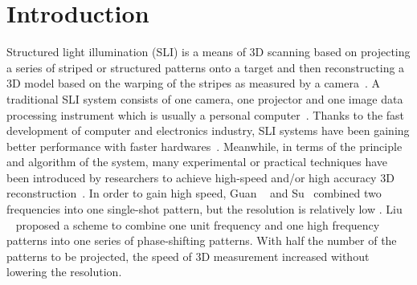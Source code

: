 \documentclass[10pt,letterpaper]{article}
\begin{document}
\section{Introduction}
Structured light illumination (SLI) is a means of 3D scanning based on projecting a series of striped or structured patterns onto a target and then reconstructing a 3D model based on the warping of the stripes as measured by a camera~\cite{inde78, posd82, boye87}.  A traditional SLI system consists of one camera, one projector and one image data processing instrument which is usually a personal computer~\cite{gort10}. Thanks to the fast development of computer and electronics industry, SLI systems have been gaining better performance with faster hardwares~\cite{gong10, zhan17}. Meanwhile, in terms of the principle and algorithm of the system, many experimental or practical techniques have been introduced by researchers to achieve high-speed and/or high accuracy 3D reconstruction~\cite{zhan17, zhan06}. In order to gain high speed, Guan {\etal}~\cite{guan03} and Su~\cite{suwh06} {\etal} combined two frequencies into one single-shot pattern, but the resolution is relatively low \cite{zhang06}. Liu {\etal}~\cite{liuk10} proposed a scheme to combine one unit frequency and one high frequency patterns into one series of phase-shifting patterns. With half the number of the patterns to be projected, the speed of 3D measurement increased without lowering the resolution.\\
\end{document}
